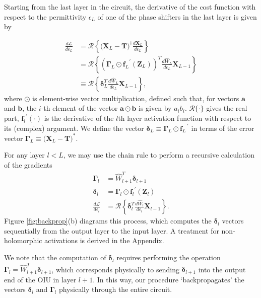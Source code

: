 Starting from the last layer in the circuit, the derivative of the cost function with respect to the permittivity $\epsilon_L$ of one of the phase shifters in the last layer is given by

\begin{align}
\frac{d\mathcal{L}}{d\epsilon_L} &= \mathcal{R}\left\{\big(\mathbf{X}_L - \mathbf{T} \big)^\dagger \frac{d\mathbf{X}_L}{d\epsilon_L} \right\}\\
    &= \mathcal{R}\left\{ \left(  \bm{\Gamma}_L \odot {\mathbf{f}_L}^{'}(\mathbf{Z}_{L}) \right)^T \frac{d \hat{W}_L}{d\epsilon_L}\mathbf{X}_{L-1} \right\}\\ 
    &\equiv \mathcal{R}\left\{ \boldsymbol{\delta}_L^T \frac{d \hat{W}_L}{d\epsilon_L} \mathbf{X}_{L-1} \right\},
\label{eq:backprop_L}
\end{align}
where $\odot$ is element-wise vector multiplication, defined such that, for vectors $\mathbf{a}$ and $\mathbf{b}$, the $i$-th element of the vector $\mathbf{a} \odot \mathbf{b}$ is given by $a_i b_i$. $\mathcal{R}\{\cdot\}$ gives the real part, ${\mathbf{f}_l}^{'}(\cdot)$ is the derivative of the $l$th layer activation function with respect to its (complex) argument.  We define the vector $\bm{\delta}_L \equiv \bm{\Gamma}_L \odot {\mathbf{f}_L}^{\,'}$ in terms of the error vector $\bm{\Gamma}_L \equiv \big(\mathbf{X}_L - \mathbf{T} \big)^*$.

For any layer $l < L$, we may use the chain rule to perform a recursive calculation of the gradients
\begin{align}
\bm{\Gamma}_l &= \hat{W}^T_{l+1} \bm{\delta}_{l+1} \label{eq:backprop_general_Gamma}
\\
\bm{\delta}_l &= \bm{\Gamma}_l \odot {\mathbf{f}_l}^{'}(\mathbf{Z}_{l}) \label{eq:backprop_general2}
\\
\frac{d\mathcal{L}}{d\epsilon_l} &= \mathcal{R}\left\{ \bm{\delta}_l^T \frac{d \hat{W}_l}{d\epsilon_l} \mathbf{X}_{l-1} \right\}.
\label{eq:backprop_general}
\end{align}
Figure \ref{fig:backprop}(b) diagrams this process, which computes the $\bm{\delta}_l$ vectors sequentially from the output layer to the input layer.  A treatment for non-holomorphic activations is derived in the Appendix.

We note that the computation of $\bm{\delta}_l$ requires performing the operation $\bm{\Gamma}_l = \hat{W}^T_{l+1} \bm{\delta}_{l+1}$, which corresponds physically to sending $\bm{\delta}_{l+1}$ into the output end of the OIU in layer $l+1$.  In this way, our procedure `backpropagates' the vectors $\bm{\delta}_l$ and $\bm{\Gamma}_l$ physically through the entire circuit.

